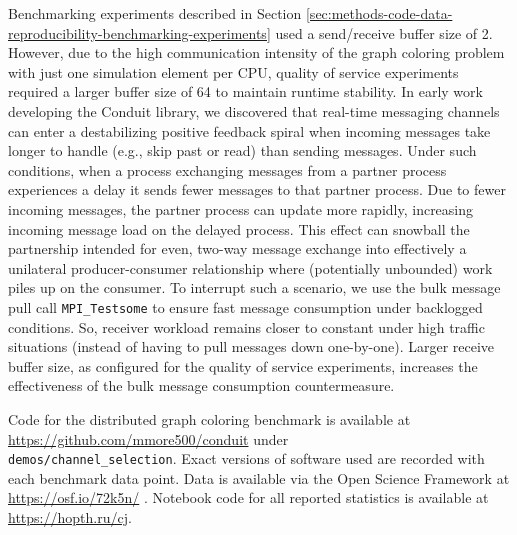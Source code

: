 Benchmarking experiments described in Section \ref{sec:methods-code-data-reproducibility-benchmarking-experiments} used a send/receive buffer size of 2.
However, due to the high communication intensity of the graph coloring problem with just one simulation element per CPU, quality of service experiments required a larger buffer size of 64 to maintain runtime stability.
In early work developing the Conduit library, we discovered that real-time messaging channels can enter a destabilizing positive feedback spiral when incoming messages take longer to handle (e.g., skip past or read) than sending messages.
Under such conditions, when a process exchanging messages from a partner process experiences a delay it sends fewer messages to that partner process.
Due to fewer incoming messages, the partner process can update more rapidly, increasing incoming message load on the delayed process.
This effect can snowball the partnership intended for even, two-way message exchange into effectively a unilateral producer-consumer relationship where (potentially unbounded) work piles up on the consumer.
To interrupt such a scenario, we use the bulk message pull call \verb|MPI_Testsome| to ensure fast message consumption under backlogged conditions.
So, receiver workload remains closer to constant under high traffic situations (instead of having to pull messages down one-by-one).
Larger receive buffer size, as configured for the quality of service experiments, increases the effectiveness of the bulk message consumption countermeasure.

Code for the distributed graph coloring benchmark is available at \url{https://github.com/mmore500/conduit} under \\ \texttt{demos/channel\_selection}.
Exact versions of software used are recorded with each benchmark data point.
Data is available via the Open Science Framework at \url{https://osf.io/72k5n/} \citep{foster2017open}.
Notebook code for all reported statistics is available at \url{https://hopth.ru/cj}.
